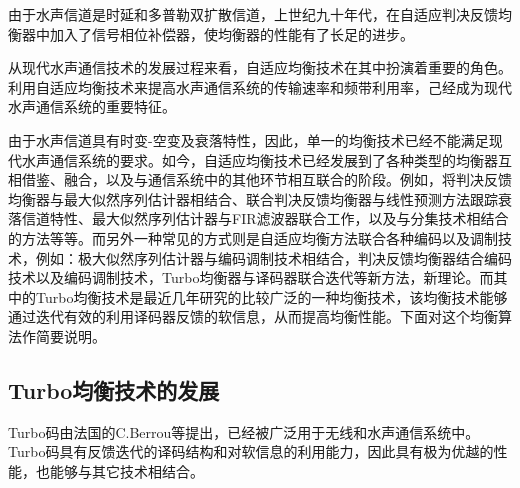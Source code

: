 由于水声信道是时延和多普勒双扩散信道，上世纪九十年代，在自适应判决反馈均衡器中加入了信号相位补偿器，使均衡器的性能有了长足的进步。

从现代水声通信技术的发展过程来看，自适应均衡技术在其中扮演着重要的角色。利用自适应均衡技术来提高水声通信系统的传输速率和频带利用率，己经成为现代水声通信系统的重要特征。

由于水声信道具有时变-空变及衰落特性，因此，单一的均衡技术已经不能满足现代水声通信系统的要求。如今，自适应均衡技术已经发展到了各种类型的均衡器互相借鉴、融合，以及与通信系统中的其他环节相互联合的阶段。例如，将判决反馈均衡器与最大似然序列估计器相结合\citep{LeNgoc1996}、联合判决反馈均衡器与线性预测方法跟踪衰落信道特性\citep{Blostein1995}、最大似然序列估计器与FIR滤波器联合工作\citep{Pasupathy1995}，以及与分集技术相结合的方法\citep{Taylor1995}等等。而另外一种常见的方式则是自适应均衡方法联合各种编码以及调制技术，例如：极大似然序列估计器与编码调制技术相结合\citep{stuber1997}\citep{Younis}，判决反馈均衡器结合编码技术以及编码调制技术\citep{Wang1996,Zhou1990,Yang2004}，Turbo均衡器与译码器联合迭代\citep{Magniez1999,Raphaeli1997,Vlahoyiannatos2001,Combined2000,Tuchler2002,Tuchler2011,Tuchler2002a,Xiang2003,Yang2007,Yang2005,Anastasopoulos1997,Hanzo2002,Ralf2004}等新方法，新理论。而其中的Turbo均衡技术是最近几年研究的比较广泛的一种均衡技术，该均衡技术能够通过迭代有效的利用译码器反馈的软信息，从而提高均衡性能。下面对这个均衡算法作简要说明。
\subsection{Turbo均衡技术的发展}
Turbo码由法国的C.Berrou\citep{berrou1993}等提出，已经被广泛用于无线和水声通信系统中。Turbo码具有反馈迭代的译码结构和对软信息的利用能力，因此具有极为优越的性能，也能够与其它技术相结合。

